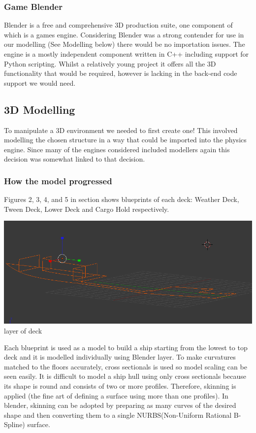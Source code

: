 \subsubsection*{Game Blender}

Blender is a free and comprehensive 3D production suite, one component
of which is a games engine. Considering Blender was a strong contender
for use in our modelling (See Modelling below) there would be no importation
issues. The engine is a mostly independent component written in C++
including support for Python scripting. Whilst a relatively young
project it offers all the 3D functionality that would be required,
however is lacking in the back-end code support we would need.


\subsection*{3D Modelling}

To manipulate a 3D environment we needed to first create one! This
involved modelling the chosen structure in a way that could be imported
into the physics engine. Since many of the engines considered included
modellers again this decision was somewhat linked to that decision.

\subsubsection{How the model progressed}
Figures 2, 3, 4, and 5 in section shows blueprints of each deck: Weather Deck, Tween Deck, Lower Deck and Cargo Hold respectively.
\begin{center}
\includegraphics[scale=0.5]{../images/deck.png}
\\layer of deck
\end{center}
Each blueprint is used as a model to build a ship starting from the lowest to top deck and it is modelled individually using Blender layer.
To make curvatures matched to the floors accurately, cross sectionals is used so model scaling can be seen easily.
It is difficult to model a ship hull using only cross sectionals because its shape is round and consists of two or more profiles.
Therefore, skinning is applied (the fine art of defining a surface using more than one profiles).
In blender, skinning can be adopted by preparing as many curves of the desired shape and then converting them to a single NURBS(Non-Uniform Rational B-Spline) 
surface.


